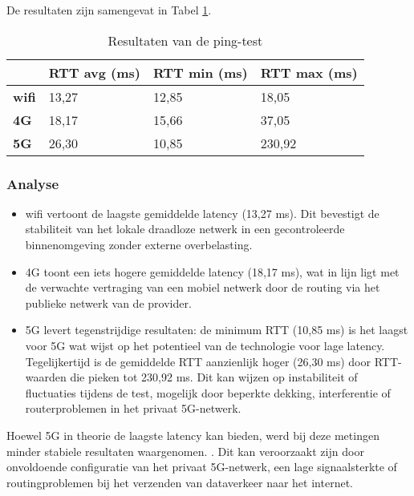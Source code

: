 De resultaten zijn samengevat in Tabel \ref{tab:latency}.
\begin{table}[]
    \caption{Resultaten van de ping-test} \label{tab:latency}
        \begin{tabular}{l l l l}
            \cline{2-4}
            & \textbf{RTT avg (ms)} & \textbf{RTT min (ms)} & \textbf{RTT max (ms)} \\ \hline
            \multicolumn{1}{l}{\textbf{wifi}} & 13,27          & 12,85          & 18,05           \\ \hline
            \multicolumn{1}{l}{\textbf{4G}}   & 18,17         & 15,66           & 37,05           \\ \hline            
            \multicolumn{1}{l}{\textbf{5G}}   & 26,30           & 10,85            & 230,92         \\ \hline
        \end{tabular}
        
    
\end{table}

\subsubsection{Analyse}
\begin{itemize}
    \item wifi vertoont de laagste gemiddelde latency (13,27 ms). Dit bevestigt de stabiliteit van het lokale draadloze netwerk in een gecontroleerde binnenomgeving zonder externe overbelasting.
    \item 4G toont een iets hogere gemiddelde latency (18,17 ms), wat in lijn ligt met de verwachte vertraging van een mobiel netwerk door de routing via het publieke netwerk van de provider.
    \item 5G levert tegenstrijdige resultaten: de minimum RTT (10,85 ms) is het laagst voor 5G wat wijst op het potentieel van de technologie voor lage latency. Tegelijkertijd is de gemiddelde RTT aanzienlijk hoger (26,30 ms) door RTT-waarden die pieken tot 230,92 ms. Dit kan wijzen op instabiliteit of fluctuaties tijdens de test, mogelijk door beperkte dekking, interferentie of routerproblemen in het privaat 5G-netwerk.
\end{itemize}
Hoewel 5G in theorie de laagste latency kan bieden, werd bij deze metingen minder stabiele resultaten waargenomen. . Dit kan veroorzaakt zijn door onvoldoende configuratie van het privaat 5G-netwerk, een lage signaalsterkte of routingproblemen bij het verzenden van dataverkeer naar het internet.


